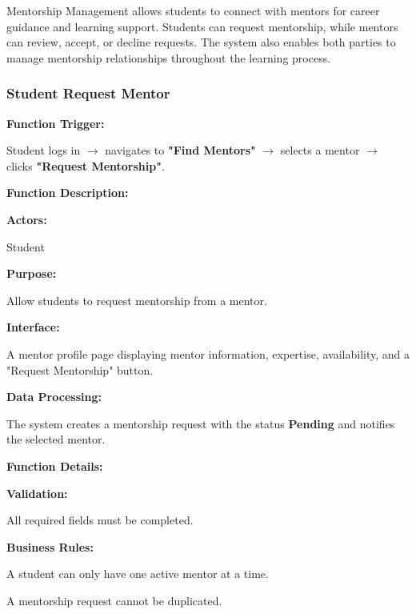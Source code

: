 Mentorship Management allows students to connect with mentors for career guidance and learning support. Students can request mentorship, while mentors can review, accept, or decline requests. The system also enables both parties to manage mentorship relationships throughout the learning process.

\subsubsection{Student Request Mentor}

\textbf{Function Trigger:}

Student logs in $\rightarrow$ navigates to \textbf{"Find Mentors"} $\rightarrow$ selects a mentor $\rightarrow$ clicks \textbf{"Request Mentorship"}.

\vspace{0.3cm}

\textbf{Function Description:}

\textbf{Actors:}

Student

\vspace{0.2cm}

\textbf{Purpose:}

Allow students to request mentorship from a mentor.

\vspace{0.2cm}

\textbf{Interface:}

A mentor profile page displaying mentor information, expertise, availability, and a "Request Mentorship" button.

\vspace{0.2cm}

\textbf{Data Processing:}

The system creates a mentorship request with the status \textbf{Pending} and notifies the selected mentor.

\vspace{0.3cm}

\textbf{Function Details:}

\textbf{Validation:}

All required fields must be completed.

\textbf{Business Rules:}

A student can only have one active mentor at a time.

A mentorship request cannot be duplicated.

